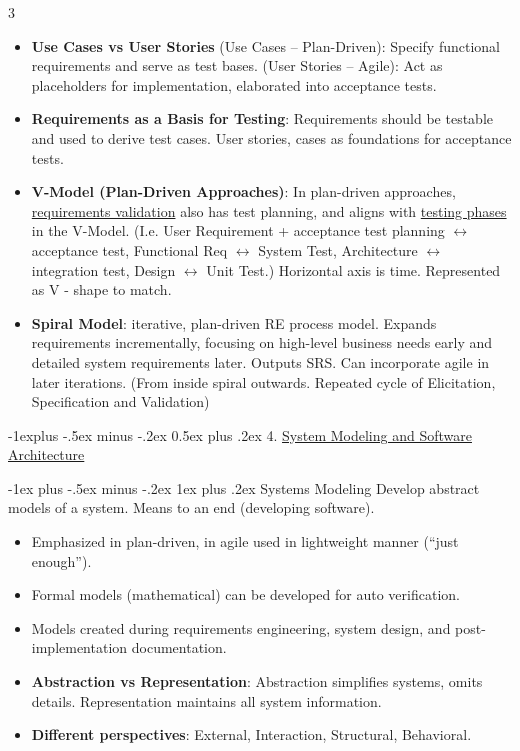 \documentclass[a4paper, 10pt, landscape]{article}
\makeatletter
\renewcommand{\subsection}{\@startsection{subsection}{2}{0mm}%
                                {-1explus -.5ex minus -.2ex}%
                                {0.5ex plus .2ex}%
                                {\normalfont\normalsize\bfseries}}
\renewcommand{\subsubsection}{\@startsection{subsubsection}{3}{0mm}%
                                {-1ex plus -.5ex minus -.2ex}%
                                {1ex plus .2ex}%
                                {\normalfont\small\bfseries}}
\makeatother
\begin{document}
\begin{multicols*}{3}
\begin{itemize}    
	    \item \textbf{Use Cases vs User Stories} (Use Cases -- Plan-Driven): Specify functional requirements and serve as test bases. (User Stories -- Agile): Act as placeholders for implementation, elaborated into acceptance tests.
	    \item \textbf{Requirements as a Basis for Testing}: Requirements should be testable and used to derive test cases. User stories, cases as foundations for acceptance tests.
	    \item \textbf{V-Model (Plan-Driven Approaches)}: In plan-driven approaches, \underline{requirements validation} also has test planning, and aligns with \underline{testing phases} in the V-Model. (I.e. User Requirement + acceptance test planning $\leftrightarrow$ acceptance test, Functional Req $\leftrightarrow$ System Test, Architecture $\leftrightarrow$ integration test, Design $\leftrightarrow$ Unit Test.) Horizontal axis is time. Represented as V - shape to match.
    \item \textbf{Spiral Model}: iterative, plan-driven RE process model. Expands requirements incrementally, focusing on high-level business needs early and detailed system requirements later. Outputs SRS. Can incorporate agile in later iterations. (From inside spiral outwards. Repeated cycle of Elicitation, Specification and Validation) 
	\end{itemize}


\subsection{4. \underline{System Modeling and Software Architecture}}

\subsubsection{Systems Modeling}
Develop abstract models of a system. Means to an end (developing software). 
\begin{itemize}
	\item Emphasized in plan-driven, in agile used in lightweight manner (“just enough”).
	\item Formal models (mathematical) can be developed for auto verification.
       \item Models created during requirements engineering, system design, and post-implementation documentation.
       \item \textbf{Abstraction vs Representation}: Abstraction simplifies systems, omits details. Representation maintains all system information.
       \item \textbf{Different perspectives}: External, Interaction, Structural, Behavioral.
\end{itemize}


\end{multicols*}
\end{document}
